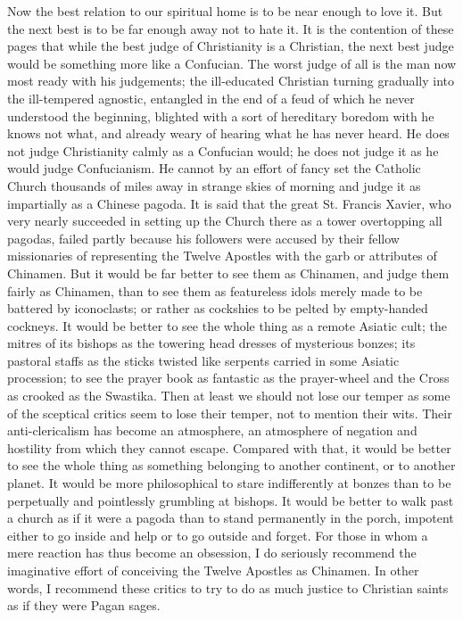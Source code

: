 Now the best relation to our spiritual home is to be near enough to love it. But the next best is to be far enough away not to hate it. It is the contention of these pages that while the best judge of Christianity is a Christian, the next best judge would be something more like a Confucian. The worst judge of all is the man now most ready with his judgements; the ill-educated Christian turning gradually into the ill-tempered agnostic, entangled in the end of a feud of which he never understood the beginning, blighted with a sort of hereditary boredom with he knows not what, and already weary of hearing what he has never heard. He does not judge Christianity calmly as a Confucian would; he does not judge it as he would judge Confucianism. He cannot by an effort of fancy set the Catholic Church thousands of miles away in strange skies of morning and judge it as impartially as a Chinese pagoda. It is said that the great St. Francis Xavier, who very nearly succeeded in setting up the Church there as a tower overtopping all pagodas, failed partly because his followers were accused by their fellow missionaries of representing the Twelve Apostles with the garb or attributes of Chinamen. But it would be far better to see them as Chinamen, and judge them fairly as Chinamen, than to see them as featureless idols merely made to be battered by iconoclasts; or rather as cockshies to be pelted by empty-handed cockneys. It would be better to see the whole thing as a remote Asiatic cult; the mitres of its bishops as the towering head dresses of mysterious bonzes; its pastoral staffs as the sticks twisted like serpents carried in some Asiatic procession; to see the prayer book as fantastic as the prayer-wheel and the Cross as crooked as the Swastika. Then at least we should not lose our temper as some of the sceptical critics seem to lose their temper, not to mention their wits. Their anti-clericalism has become an atmosphere, an atmosphere of negation and hostility from which they cannot escape. Compared with that, it would be better to see the whole thing as something belonging to another continent, or to another planet. It would be more philosophical to stare indifferently at bonzes than to be perpetually and pointlessly grumbling at bishops. It would be better to walk past a church as if it were a pagoda than to stand permanently in the porch, impotent either to go inside and help or to go outside and forget. For those in whom a mere reaction has thus become an obsession, I do seriously recommend the imaginative effort of conceiving the Twelve Apostles as Chinamen. In other words, I recommend these critics to try to do as much justice to Christian saints as if they were Pagan sages.

